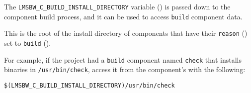 The \texttt{LMSBW\_C\_BUILD\_INSTALL\_DIRECTORY} variable
() is passed down to the component
build process, and it can be used to access \texttt{build} component
data.

This is the root of the install directory of components that have
their \texttt{reason} () set to \texttt{build}
().

For example, if the project had a \texttt{build} component named
\texttt{check} that installs binaries in \texttt{/usr/bin/check},
access it from the component's \makefile with the following:

\begin{verbatim}
$(LMSBW_C_BUILD_INSTALL_DIRECTORY)/usr/bin/check
\end{verbatim}
